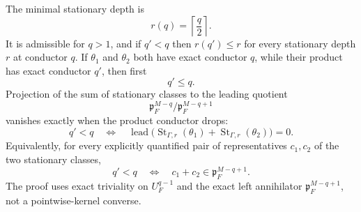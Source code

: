 \begin{lemma}
The minimal stationary depth is
\[
 r(q)=\left\lceil\frac q2\right\rceil.
\]
It is admissible for $q>1$, and if $q'<q$ then
$r(q')\leq r$ for every stationary depth $r$ at conductor $q$.
If $\theta_1$ and $\theta_2$ both have exact conductor $q$, while their
product has exact conductor $q'$, then first
\[
 q'\leq q.
\]
Projection of the sum of stationary classes to the leading quotient
\[
 \mathfrak p_F^{M-q}/\mathfrak p_F^{M-q+1}
\]
vanishes exactly when the product conductor drops:
\[
 q'<q
 \quad\Longleftrightarrow\quad
 \operatorname{lead}
 \bigl(\operatorname{St}_{\Gamma,r}(\theta_1)
       +\operatorname{St}_{\Gamma,r}(\theta_2)\bigr)=0.
\]
Equivalently, for every explicitly quantified pair of representatives
$c_1,c_2$ of the two stationary classes,
\[
 q'<q
 \quad\Longleftrightarrow\quad
 c_1+c_2\in\mathfrak p_F^{M-q+1}.
\]
The proof uses exact triviality on $U_F^{q-1}$ and the exact left
annihilator $\mathfrak p_F^{M-q+1}$, not a pointwise-kernel converse.


\end{lemma}
